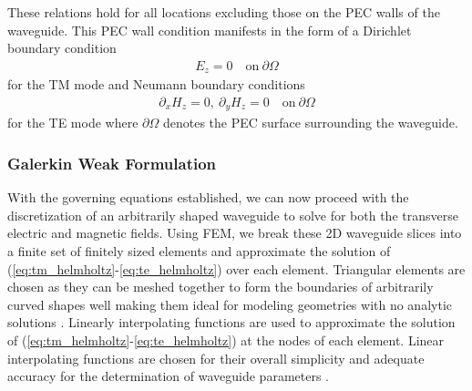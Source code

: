 These relations hold for all locations excluding those on the PEC walls of the waveguide. This PEC wall condition manifests in the form of a Dirichlet boundary condition
\begin{align}
	E_z=0 \quad \mathrm{on} \ \partial\Omega
	\label{eq:diriclet_tm}
\end{align}
for the TM mode and Neumann boundary conditions
\begin{align}
	\partial_x H_z = 0,\ \partial_y H_z = 0 \quad \mathrm{on} \ \partial\Omega
\end{align}
for the TE mode where $\partial\Omega$ denotes the PEC surface surrounding the waveguide.

\subsubsection{Galerkin Weak Formulation}
\label{subsub:galerkin_weak}
With the governing equations established, we can now proceed with the discretization of an arbitrarily shaped waveguide to solve for both the transverse electric and magnetic fields. Using FEM, we break these 2D waveguide slices into a finite set of finitely sized elements and approximate the solution of (\ref{eq:tm_helmholtz}-\ref{eq:te_helmholtz}) over each element. Triangular elements are chosen as they can be meshed together to form the boundaries of arbitrarily curved shapes well making them ideal for modeling geometries with no analytic solutions \cite{jin2011theory}. Linearly interpolating functions are used to approximate the solution of (\ref{eq:tm_helmholtz}-\ref{eq:te_helmholtz}) at the nodes of each element. Linear interpolating functions are chosen for their overall simplicity and adequate accuracy for the determination of waveguide parameters \cite{rothlecnotes}\cite{jin2011theory}. 

